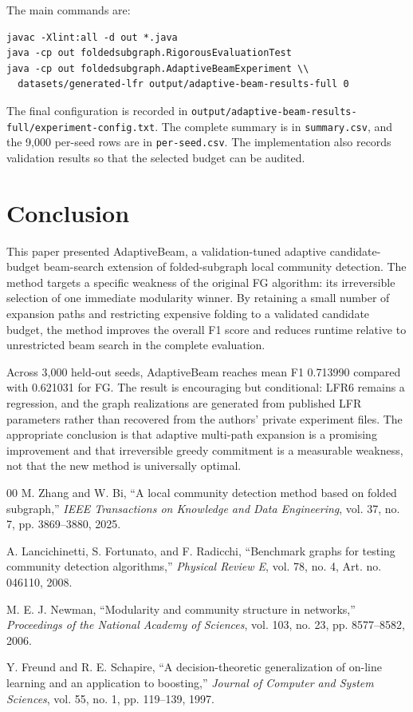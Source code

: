 \documentclass[10pt,journal,compsoc]{IEEEtran}
\begin{document}
The main commands are:
\begin{verbatim}
javac -Xlint:all -d out *.java
java -cp out foldedsubgraph.RigorousEvaluationTest
java -cp out foldedsubgraph.AdaptiveBeamExperiment \\
  datasets/generated-lfr output/adaptive-beam-results-full 0
\end{verbatim}

The final configuration is recorded in
\texttt{output/adaptive-beam-results-full/experiment-config.txt}. The complete
summary is in \texttt{summary.csv}, and the 9,000 per-seed rows are in
\texttt{per-seed.csv}. The implementation also records validation results so
that the selected budget can be audited.

\section{Conclusion}
This paper presented AdaptiveBeam, a validation-tuned adaptive
candidate-budget beam-search extension of folded-subgraph local community
detection. The method targets a specific weakness of the original FG
algorithm: its irreversible selection of one immediate modularity winner. By
retaining a small number of expansion paths and restricting expensive folding
to a validated candidate budget, the method improves the overall F1 score and
reduces runtime relative to unrestricted beam search in the complete
evaluation.

Across 3,000 held-out seeds, AdaptiveBeam reaches mean F1 0.713990 compared
with 0.621031 for FG. The result is encouraging but conditional: LFR6 remains
a regression, and the graph realizations are generated from published LFR
parameters rather than recovered from the authors' private experiment files.
The appropriate conclusion is that adaptive multi-path expansion is a
promising improvement and that irreversible greedy commitment is a measurable
weakness, not that the new method is universally optimal.

\begin{thebibliography}{00}
M. Zhang and W. Bi, ``A local community detection method based on folded
subgraph,'' \emph{IEEE Transactions on Knowledge and Data Engineering},
vol. 37, no. 7, pp. 3869--3880, 2025.

A. Lancichinetti, S. Fortunato, and F. Radicchi, ``Benchmark graphs for
testing community detection algorithms,'' \emph{Physical Review E}, vol. 78,
no. 4, Art. no. 046110, 2008.

M. E. J. Newman, ``Modularity and community structure in networks,''
\emph{Proceedings of the National Academy of Sciences}, vol. 103, no. 23,
pp. 8577--8582, 2006.

Y. Freund and R. E. Schapire, ``A decision-theoretic generalization of
on-line learning and an application to boosting,'' \emph{Journal of Computer
and System Sciences}, vol. 55, no. 1, pp. 119--139, 1997.
\end{thebibliography}
\end{document}
